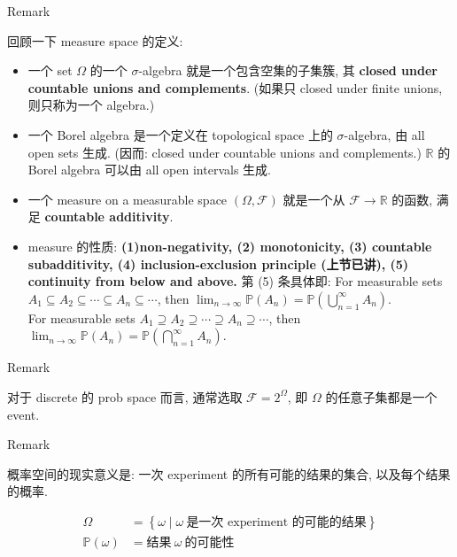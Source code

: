 \documentclass{qlnotes-export}
\begin{document}
\begin{qlremark}{Remark}

回顾一下 measure space 的定义:

\begin{itemize}
\item
  一个 set \(\Omega\) 的一个 \(\sigma\)-algebra 就是一个包含空集的子集簇, 其 \textbf{closed under countable unions and complements}. (如果只 closed under finite unions, 则只称为一个 algebra.)
\item
  一个 Borel algebra 是一个定义在 topological space 上的 \(\sigma\)-algebra, 由 all open sets 生成. (因而: closed under countable unions and complements.) \(\mathbb{R}\) 的 Borel algebra 可以由 all open intervals 生成.
\item
  一个 measure on a measurable space \((\Omega,\mathcal{F})\) 就是一个从 \(\mathcal{F}\rightarrow{\mathbb{R}}\) 的函数, 满足 \textbf{countable additivity}.
\item
  measure 的性质: \textbf{(1)non-negativity, (2) monotonicity, (3) countable subadditivity, (4) inclusion-exclusion principle (上节已讲), (5) continuity from below and above.} 第 (5) 条具体即: For measurable sets \(A_{1} \subseteq A_{2} \subseteq \cdots \subseteq A_{n} \subseteq \cdots\), then \(\lim_{n\rightarrow\infty}{\mathbb{P}}(A_{n}) = {\mathbb{P}}(\bigcup_{n = 1}^{\infty}A_{n})\).\\
  For measurable sets \(A_{1} \supseteq A_{2} \supseteq \cdots \supseteq A_{n} \supseteq \cdots\), then \(\lim_{n\rightarrow\infty}{\mathbb{P}}(A_{n}) = {\mathbb{P}}(\bigcap_{n = 1}^{\infty}A_{n})\).
\end{itemize}

\end{qlremark}

\begin{qlremark}{Remark}

对于 discrete 的 prob space 而言, 通常选取 \(\mathcal{F} = 2^{\Omega}\), 即 \(\Omega\) 的任意子集都是一个 event.

\end{qlremark}

\begin{qlremark}{Remark}

概率空间的现实意义是: 一次 experiment 的所有可能的结果的集合, 以及每个结果的概率.

\[\begin{matrix}
\Omega & {= \left\{ {\omega \mid \omega\ \text{是一次 experiment 的可能的结果}} \right\}} \\
{{\mathbb{P}}(\omega)} & {= \text{结果}\ \omega\ \text{的可能性}}
\end{matrix}\]

\end{qlremark}
\end{document}
